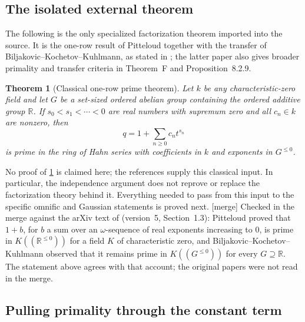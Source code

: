 \documentclass[11pt,letterpaper]{article}
\newtheorem{theorem}{Theorem}[section]
\theoremstyle{definition}
\theoremstyle{remark}
\newcommand{\R}{\mathbb R}
\newcommand{\mtag}{\textup{[merge]}}%
\numberwithin{equation}{section}
\begin{document}
\subsection{The isolated external theorem}

The following is the only specialized factorization theorem imported
into the source. It is the one-row result of Pitteloud together
with the transfer of Biljakovic--Kochetov--Kuhlmann, as stated in
\cite[\S1.3]{LM}; the latter paper also gives broader primality and
transfer criteria in Theorem~F and Proposition~8.2.9.

\begin{theorem}[Classical one-row prime theorem]\label{isc:hj:thm:classicalprime}
Let $k$ be any characteristic-zero field and let $G$ be a set-sized
ordered abelian group containing the ordered additive group $\R$.
If $s_0<s_1<\cdots<0$ are real numbers with supremum zero and all
$c_n\in k$ are nonzero, then
\[
 q=1+\sum_{n\geq0}c_nt^{s_n}
\]
is prime in the ring of Hahn series with coefficients in $k$ and
exponents in $G^{\leq0}$.
\end{theorem}

No proof of \cref{isc:hj:thm:classicalprime} is claimed here; the references
\cite{Pitteloud,BKK,LM} supply this classical input. In particular,
the independence argument does not reprove or replace the factorization
theory behind it. Everything needed to pass from this input to the
specific omnific and Gaussian statements is proved next.
\mtag{} Checked in the merge against the arXiv text of \cite{LM}
(version~5, Section~1.3): Pitteloud proved that $1+b$, for $b$ a sum over
an $\omega$-sequence of real exponents increasing to $0$, is prime in
$K((\R^{\le0}))$ for a field $K$ of characteristic zero, and
Biljakovic--Kochetov--Kuhlmann observed that it remains prime in
$K((G^{\le0}))$ for every $G\supseteq\R$. The statement above agrees with that
account; the original papers were not read in the merge.

\subsection{Pulling primality through the constant term}
\end{document}

